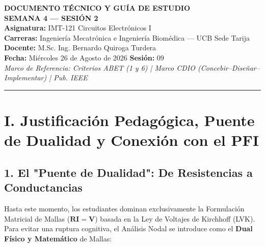 \documentclass[11pt, a4paper]{article}
\begin{document}
\begin{center}
    {\LARGE \textbf{DOCUMENTO TÉCNICO Y GUÍA DE ESTUDIO}} \\[0.2cm]
    {\Large \textbf{SEMANA 4 — SESIÓN 2}} \\[0.4cm]
    \normalsize
    \textbf{Asignatura:} IMT-121 Circuitos Electrónicos I \\
    \textbf{Carreras:} Ingeniería Mecatrónica e Ingeniería Biomédica — UCB Sede Tarija \\[0.2cm]
    \textbf{Docente:} M.Sc. Ing. Bernardo Quiroga Turdera \\
    \textbf{Fecha:} Miércoles 26 de Agosto de 2026 \hspace{0.5cm} \textbf{Sesión:} 09 \\[0.2cm]
    \textit{Marco de Referencia: Criterios ABET (1 y 6) | Marco CDIO (Concebir–Diseñar–Implementar) | Pub. IEEE}
    \vspace{0.4cm}
\end{center}
\hrule
\vspace{0.5cm}

\section{I. Justificación Pedagógica, Puente de Dualidad y Conexión con el PFI}

\subsection{1. El "Puente de Dualidad": De Resistencias a Conductancias}
Hasta este momento, los estudiantes dominan exclusivamente la Formulación Matricial de Mallas ($\mathbf{R}\mathbf{I} = \mathbf{V}$) basada en la Ley de Voltajes de Kirchhoff (LVK). Para evitar una ruptura cognitiva, el Análisis Nodal se introduce como el \textbf{Dual Físico y Matemático} de Mallas:
\end{document}
